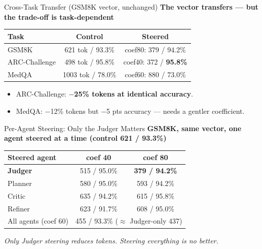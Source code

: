 \documentclass{beamer}
\begin{document}
\begin{frame}{Cross-Task Transfer (GSM8K vector, unchanged)}
    \textbf{The vector transfers --- but the trade-off is task-dependent}
    \vspace{0.2cm}
    \begin{table}[]
        \centering
        \begin{tabular}{|l|c|c|}
            \hline
            \textbf{Task} & \textbf{Control} & \textbf{Steered} \\ \hline
            GSM8K & 621 tok / 93.3\% & coef80: 379 / 94.2\% \\ \hline
            ARC-Challenge & 498 tok / 95.8\% & coef40: 372 / \textbf{95.8\%} \\ \hline
            MedQA & 1003 tok / 78.0\% & coef60: 880 / 73.0\% \\ \hline
        \end{tabular}
    \end{table}
    \vspace{0.2cm}
    \begin{itemize}
        \item ARC-Challenge: \textbf{$-$25\% tokens at identical accuracy}.
        \item MedQA: $-$12\% tokens but $-$5 pts accuracy --- needs a gentler coefficient.
    \end{itemize}
\end{frame}

\begin{frame}{Per-Agent Steering: Only the Judger Matters}
    \textbf{GSM8K, same vector, one agent steered at a time (control 621 / 93.3\%)}
    \vspace{0.2cm}
    \begin{table}[]
        \centering
        \begin{tabular}{|l|c|c|}
            \hline
            \textbf{Steered agent} & \textbf{coef 40} & \textbf{coef 80} \\ \hline
            \textbf{Judger} & 515 / 95.0\% & \textbf{379 / 94.2\%} \\ \hline
            Planner & 580 / 95.0\% & 593 / 94.2\% \\ \hline
            Critic & 635 / 94.2\% & 615 / 95.8\% \\ \hline
            Refiner & 623 / 91.7\% & 608 / 95.0\% \\ \hline
            All agents (coef 60) & \multicolumn{2}{c|}{455 / 93.3\% ($\approx$ Judger-only 437)} \\ \hline
        \end{tabular}
    \end{table}
    \vspace{0.2cm}
    \begin{center}\textit{Only Judger steering reduces tokens. Steering everything is no better.}\end{center}
\end{frame}
\end{document}
